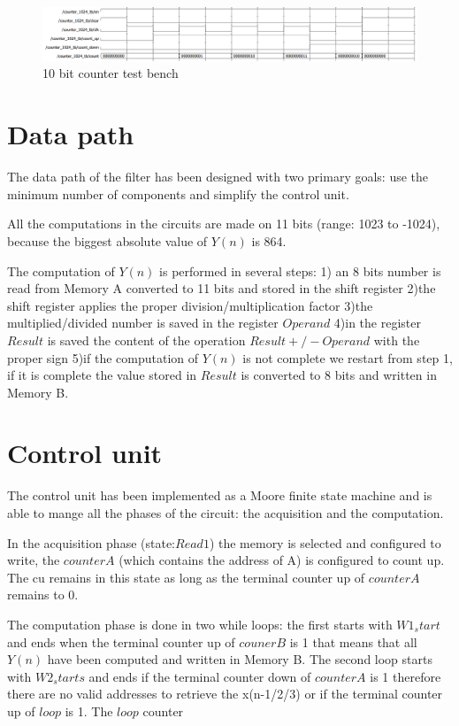 \documentclass[12pt]{article}
\begin{document}
\begin{figure}[h]
	\centering
	\includegraphics[scale = 0.47]{immagini/counter_tb.png}
	\caption{10 bit counter test bench}
\end{figure}

\section*{Data path}
The data path of the filter has been designed with two primary goals: use the minimum number of components and simplify the control unit.

All the computations in the circuits are made on 11 bits (range: 1023 to -1024), because the biggest absolute value of $Y(n)$ is 864. 

The computation of $Y(n)$ is performed in several steps:
1) an 8 bits number is read from Memory A converted to 11 bits and stored in the shift register
2)the shift register applies the proper division/multiplication factor
3)the multiplied/divided number is saved in the register $Operand$
4)in the register $Result$ is saved the content of the operation $Result +/- Operand$ with the proper sign
5)if the computation of $Y(n)$ is not complete we restart from step 1, if it is complete the value stored in $Result$ is converted to 8 bits and written in Memory B.

\section*{Control unit}
The control unit has been implemented as a Moore finite state machine and is able to mange all the phases of the circuit: the acquisition and the computation.   

In the acquisition phase (state:$Read1$) the memory is selected and configured to write, the $counterA$ (which contains the address of A) is configured to count up. The cu remains in this state as long as the terminal counter up of $counterA$ remains to 0. 

The computation phase is done in two while loops: the first starts with $W1_start$ and ends when the terminal counter up of $couner B$ is 1 that means that all $Y(n)$ have been computed and written in Memory B. The second loop starts with $W2_starts$ and ends if the terminal counter down of $counterA$ is 1 therefore there are no valid addresses to retrieve the x(n-1/2/3) or if the terminal counter up of $loop$ is 1. The $loop$ counter
\end{document}
